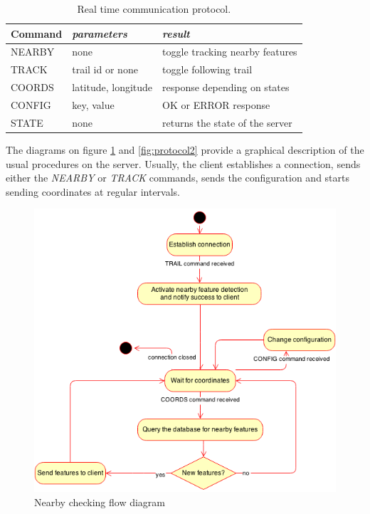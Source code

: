 \begin{table}[ht]
  \centering
  \caption{Real time communication protocol.}\label{tab:protocol}
  \begin{tabular}{lll}
    \toprule
      \textbf{Command} & \emph{parameters}  & \emph{result}\\
    \midrule
      NEARBY & none & toggle tracking nearby features\\
      TRACK & trail id or none & toggle following trail\\
      COORDS & latitude, longitude & response depending on states\\
      CONFIG & key, value & OK or ERROR response\\
      STATE & none & returns the state of the server\\
    \bottomrule
  \end{tabular}
\end{table}

The diagrams on figure \ref{fig:protocol1} and \ref{fig:protocol2} provide a graphical description of the usual procedures on the server. Usually, the client establishes a connection, sends either the \textit{NEARBY} or \textit{TRACK} commands, sends the configuration and starts sending coordinates at regular intervals.

\begin{figure}[ht]
  \centering
  \includegraphics[width=.7\textwidth]{fig/protocol1}
  \caption{Nearby checking flow diagram}
  \label{fig:protocol1}
\end{figure} 

